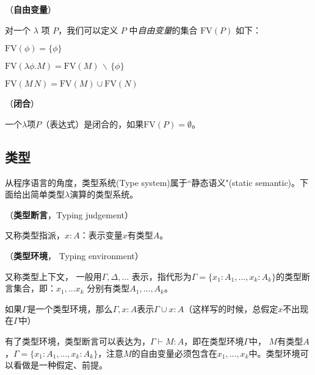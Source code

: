\begin{defn} （\textbf{自由变量}）

  对一个 $\lambda$ 项 $P$，我们可以定义 $P$ 中\emph{自由变量}的集合
  $\text{FV}(P)$ 如下：
  \begin{tightenum}
  \item $\text{FV}(\phi) = \{\phi\}$
  \item $\text{FV}(\lambda\phi.M) = \text{FV}(M)\,\backslash\,\{\phi\}$\label{enum:fvforabs}
  \item $\text{FV}(M\,N) = \text{FV}(M)\cup\text{FV}(N)$
  \end{tightenum}

\end{defn}

\begin{defn}（\textbf{闭合}）

一个$\lambda$项$P$（表达式）是闭合的，如果$\text{FV}(P)=\emptyset$。

\end{defn}


\subsection{类型}

从程序语言的角度，类型系统(Type system)属于``静态语义"(static semantic)。下面给出简单类型$\lambda$演算的类型系统。

\begin{defn}（\textbf{类型断言}，Typing judgement）

又称类型指派，$x:A$：表示变量$x$有类型$A$。

\end{defn}

\begin{defn}（\textbf{类型环境}， Typing environment）

又称类型上下文， 一般用$\Gamma, \Delta,...$ 表示，指代形为$\Gamma = \{x_1:A_1,...,x_k:A_k \}$的类型断言集合，即：$x_1,...x_k$ 分别有类型$A_1,...,A_k$。

\end{defn}

\begin{note}

如果$\Gamma$是一个类型环境，那么$\Gamma, x:A$表示$\Gamma \cup {x:A}$（这样写的时候，总假定$x$不出现在$\Gamma$中）

\end{note}

有了类型环境，类型断言可以表达为，$\Gamma \vdash M:A$，即在类型环境$\Gamma$中， $M$有类型$A$，$\Gamma = \{x_1:A_1,...,x_k:A_k \}$，注意$M$的自由变量必须包含在$x_1, ..., x_k$中。类型环境可以看做是一种假定、前提。


